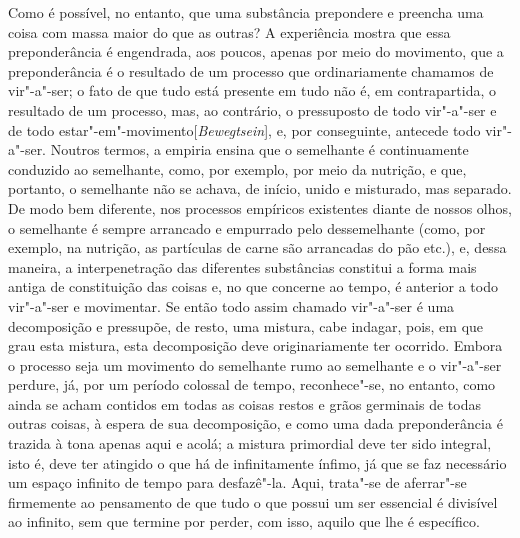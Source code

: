 Como é possível, no entanto, que uma substância prepondere e preencha uma
coisa com massa maior do que as outras? A experiência mostra que essa
preponderância é engendrada, aos poucos, apenas por meio do movimento, que a
preponderância é o resultado de um processo que ordinariamente chamamos de
vir"-a"-ser; o fato de que tudo está presente em tudo não é, em
contrapartida, o resultado de um processo, mas, ao contrário, o pressuposto
de todo vir"-a"-ser e de todo estar"-em"-movimento[\textit{Bewegtsein}], e,
por conseguinte, antecede todo vir"-a"-ser. Noutros termos, a empiria ensina
que o semelhante é continuamente conduzido ao semelhante, como, por exemplo,
por meio da nutrição, e que, portanto, o semelhante não se achava, de início,
unido e misturado, mas separado. De modo bem diferente, nos processos
empíricos existentes diante de nossos olhos, o semelhante é sempre arrancado
e empurrado pelo dessemelhante (como, por exemplo, na nutrição, as partículas
de carne são arrancadas do pão etc.), e, dessa maneira, a interpenetração das
diferentes substâncias constitui a forma mais antiga de constituição das
coisas e, no que concerne ao tempo, é anterior a todo vir"-a"-ser e
movimentar. Se então todo assim chamado vir"-a"-ser é uma decomposição e
pressupõe, de resto, uma mistura, cabe indagar, pois, em que grau esta
mistura, esta decomposição deve originariamente ter ocorrido. Embora o
processo seja um movimento do semelhante rumo ao semelhante e o vir"-a"-ser
perdure, já, por um período colossal de tempo, reconhece"-se, no entanto,
como ainda se acham contidos em todas as coisas restos e grãos germinais de
todas outras coisas, à espera de sua decomposição, e como uma dada
preponderância é trazida à tona apenas aqui e acolá; a mistura primordial
deve ter sido integral, isto é, deve ter atingido o que há de infinitamente
ínfimo, já que se faz necessário um espaço infinito de tempo para
desfazê"-la. Aqui, trata"-se de aferrar"-se firmemente ao pensamento de que
tudo o que possui um ser essencial é divisível ao infinito, sem que termine
por perder, com isso, aquilo que lhe é específico.

